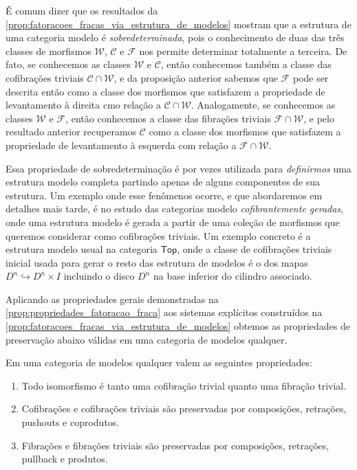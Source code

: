 \begin{obs}
  É comum dizer que os resultados da \cref{prop:fatoracoes_fracas_via_estrutura_de_modelos} mostram que a estrutura de uma categoria modelo é \emph{sobredeterminada}, pois o conhecimento de duas das três classes de morfismos $\mathcal{W}$, $\mathcal{C}$ e $\mathcal{F}$ nos permite determinar totalmente a terceira.
  De fato, se conhecemos as classes $\mathcal{W}$ e $\mathcal{C}$, então conhecemos também a classe das cofibrações triviais $\mathcal{C} \cap \mathcal{W}$, e da proposição anterior sabemos que $\mathcal{F}$ pode ser descrita então como a classe dos morfismos que satisfazem a propriedade de levantamento à direita cmo relação a $\mathcal{C} \cap \mathcal{W}$.
  Analogamente, se conhecemos as classes $\mathcal{W}$ e $\mathcal{F}$, então conhecemos a classe das fibrações triviais $\mathcal{F} \cap \mathcal{W}$, e pelo resultado anterior recuperamos $\mathcal{C}$ como a classe dos morfismos que satisfazem a propriedade de levantamento à esquerda com relação a $\mathcal{F} \cap \mathcal{W}$.

  Essa propriedade de sobredeterminação é por vezes utilizada para \emph{definirmos} uma estrutura modelo completa partindo apenas de alguns componentes de sua estrutura.
  Um exemplo onde esse fenômenos ocorre, e que abordaremos em detalhes mais tarde, é no estudo das categorias modelo \emph{cofibrantemente geradas}, onde uma estrutura modelo é gerada a partir de uma coleção de morfismos que queremos considerar como cofibrações triviais.
  Um exemplo concreto é a estrutura modelo usual na categoria $\mathsf{Top}$, onde a classe de cofibrações triviais inicial usada para gerar o resto das estrutura de modelos é o dos mapas $D^{n} \hookrightarrow D^{n} \times I$ incluindo o disco $D^{n}$ na base inferior do cilindro associado.
\end{obs}

Aplicando as propriedades gerais demonstradas na \cref{prop:propriedades_fatoracao_fraca} aos sistemas explícitos construídos na \cref{prop:fatoracoes_fracas_via_estrutura_de_modelos} obtemos as propriedades de preservação abaixo válidas em uma categoria de modelos qualquer.

\begin{corol}\label{corol:props_preservacao_categoria_de_modelos}
  Em uma categoria de modelos qualquer valem as seguintes propriedades:
  \begin{enumerate}
  \item Todo isomorfismo é tanto uma cofibração trivial quanto uma fibração trivial.
    
  \item Cofibrações e cofibrações triviais são preservadas por composições, retrações, pushouts e coprodutos.

  \item Fibrações e fibrações triviais são preservadas por composições, retrações, pullback e produtos.
  \end{enumerate}
\end{corol}

